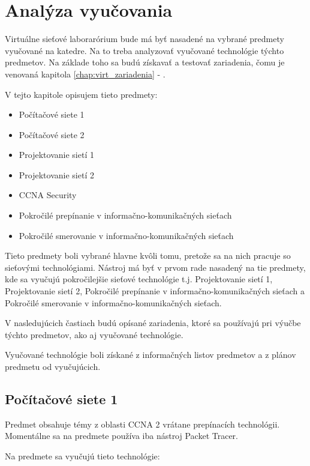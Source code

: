 \chapter{Analýza vyučovania}
\label{chap:analyza_vyucovania}

Virtuálne sieťové laborarórium bude má byť nasadené na vybrané predmety vyučované na katedre. Na to treba analyzovať vyučované technológie týchto predmetov. Na základe toho sa budú získavať a testovať zariadenia, čomu je venovaná kapitola \ref{chap:virt_zariadenia} - .

V tejto kapitole opisujem tieto predmety:
\begin{itemize}
    \item Počítačové siete 1
    \item Počítačové siete 2
    \item Projektovanie sietí 1
    \item Projektovanie sietí 2
    \item CCNA Security
    \item Pokročilé prepínanie v informačno-komunikačných sieťach
    \item Pokročilé smerovanie v informačno-komunikačných sieťach
\end{itemize}

Tieto predmety boli vybrané hlavne kvôli tomu, pretože sa na nich pracuje so sieťovými technológiami. Nástroj má byť v prvom rade nasadený na tie predmety, kde sa vyučujú pokročilejšie sieťové technológie t.j. Projektovanie sietí 1, Projektovanie sietí 2, Pokročilé prepínanie v informačno-komunikačných sieťach a Pokročilé smerovanie v informačno-komunikačných sieťach.

V nasledujúcich častiach budú opísané zariadenia, ktoré sa používajú pri výučbe týchto predmetov, ako aj vyučované technológie.

Vyučované technológie boli získané z informačných listov predmetov a z plánov predmetu od vyučujúcich.




\section{Počítačové siete 1}

Predmet obsahuje témy z oblasti CCNA 2 vrátane prepínacích technológii. Momentálne sa na predmete používa iba nástroj Packet Tracer.

Na predmete sa vyučujú tieto technológie:

